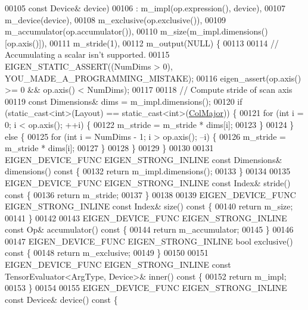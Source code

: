 \begin{DoxyCode}
00105                                                         \textcolor{keyword}{const} Device& device)
00106       : m\_impl(op.expression(), device),
00107         m\_device(device),
00108         m\_exclusive(op.exclusive()),
00109         m\_accumulator(op.accumulator()),
00110         m\_size(m\_impl.dimensions()[op.axis()]),
00111         m\_stride(1),
00112         m\_output(NULL) \{
00113 
00114     \textcolor{comment}{// Accumulating a scalar isn't supported.}
00115     EIGEN\_STATIC\_ASSERT((NumDims > 0), YOU\_MADE\_A\_PROGRAMMING\_MISTAKE);
00116     eigen\_assert(op.axis() >= 0 && op.axis() < NumDims);
00117 
00118     \textcolor{comment}{// Compute stride of scan axis}
00119     \textcolor{keyword}{const} Dimensions& dims = m\_impl.dimensions();
00120     \textcolor{keywordflow}{if} (static\_cast<int>(Layout) == static\_cast<int>(\hyperlink{group__enums_ggaacded1a18ae58b0f554751f6cdf9eb13a0cbd4bdd0abcfc0224c5fcb5e4f6669a}{ColMajor})) \{
00121       \textcolor{keywordflow}{for} (\textcolor{keywordtype}{int} i = 0; i < op.axis(); ++i) \{
00122         m\_stride = m\_stride * dims[i];
00123       \}
00124     \} \textcolor{keywordflow}{else} \{
00125       \textcolor{keywordflow}{for} (\textcolor{keywordtype}{int} i = NumDims - 1; i > op.axis(); --i) \{
00126         m\_stride = m\_stride * dims[i];
00127       \}
00128     \}
00129   \}
00130 
00131   EIGEN\_DEVICE\_FUNC EIGEN\_STRONG\_INLINE \textcolor{keyword}{const} Dimensions& dimensions()\textcolor{keyword}{ const }\{
00132     \textcolor{keywordflow}{return} m\_impl.dimensions();
00133   \}
00134 
00135   EIGEN\_DEVICE\_FUNC EIGEN\_STRONG\_INLINE \textcolor{keyword}{const} Index& stride()\textcolor{keyword}{ const }\{
00136     \textcolor{keywordflow}{return} m\_stride;
00137   \}
00138 
00139   EIGEN\_DEVICE\_FUNC EIGEN\_STRONG\_INLINE \textcolor{keyword}{const} Index& size()\textcolor{keyword}{ const }\{
00140     \textcolor{keywordflow}{return} m\_size;
00141   \}
00142 
00143   EIGEN\_DEVICE\_FUNC EIGEN\_STRONG\_INLINE \textcolor{keyword}{const} Op& accumulator()\textcolor{keyword}{ const }\{
00144     \textcolor{keywordflow}{return} m\_accumulator;
00145   \}
00146 
00147   EIGEN\_DEVICE\_FUNC EIGEN\_STRONG\_INLINE \textcolor{keywordtype}{bool} exclusive()\textcolor{keyword}{ const }\{
00148     \textcolor{keywordflow}{return} m\_exclusive;
00149   \}
00150 
00151   EIGEN\_DEVICE\_FUNC EIGEN\_STRONG\_INLINE \textcolor{keyword}{const} TensorEvaluator<ArgType, Device>& inner()\textcolor{keyword}{ const }\{
00152     \textcolor{keywordflow}{return} m\_impl;
00153   \}
00154 
00155   EIGEN\_DEVICE\_FUNC EIGEN\_STRONG\_INLINE \textcolor{keyword}{const} Device& device()\textcolor{keyword}{ const }\{

\end{DoxyCode}
